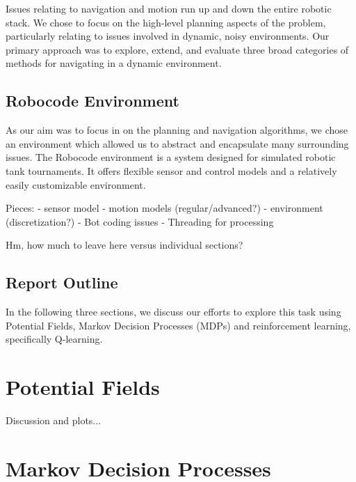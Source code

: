 \documentclass{aiaa-tc}%
\begin{document}
Issues relating to navigation and motion run up and down the entire
robotic stack. We chose to focus on the high-level planning aspects of
the problem, particularly relating to issues involved in dynamic,
noisy environments. Our primary approach was to explore, extend, and
evaluate three broad categories of methods for navigating in a dynamic
environment.

\subsection{Robocode Environment}

As our aim was to focus in on the planning and navigation algorithms,
we chose an environment which allowed us to abstract and encapsulate many
surrounding issues. The Robocode environment is a system designed for
simulated robotic tank tournaments. It offers flexible sensor and
control models and a relatively easily customizable environment.

Pieces:
- sensor model
- motion models (regular/advanced?)
- environment (discretization?)
- Bot coding issues
  - Threading for processing

Hm, how much to leave here versus individual sections?


\subsection{Report Outline}
In the following three sections, we discuss our efforts to explore
this task using Potential Fields, Markov Decision Processes (MDPs) and
reinforcement learning, specifically Q-learning.

\section{Potential Fields}
\label{Potential Fields}
Discussion and plots...

\section{Markov Decision Processes}
\label{Markov Decision Processes}
\end{document}
